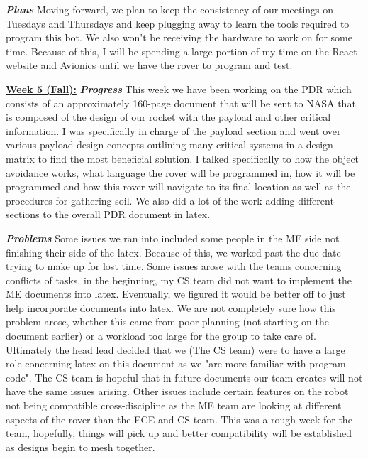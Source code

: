 \documentclass[onecolumn, draftclsnofoot, 10pt, compsoc]{IEEEtran}
\begin{document}
\textbf{\textit{{Plans}}}
\newline 
Moving forward, we plan to keep the consistency of our meetings on Tuesdays and Thursdays and keep plugging away to learn the tools required to program this bot. We also won't be receiving the hardware to work on for some time. Because of this, I will be spending a large portion of my time on the React website and Avionics until we have the rover to program and test. \\
\newline 

\underline{\textbf{Week 5 (Fall):}}
\newline\textbf{\textit{{Progress}}}
\newline 
This week we have been working on the PDR which consists of an approximately 160-page document that will be sent to NASA that is composed of the design of our rocket with the payload and other critical information. I was specifically in charge of the payload section and went over various payload design concepts outlining many critical systems in a design matrix to find the most beneficial solution. I talked specifically to how the object avoidance works, what language the rover will be programmed in, how it will be programmed and how this rover will navigate to its final location as well as the procedures for gathering soil.  We also did a lot of the work adding different sections to the overall PDR document in latex. 
\newline 

\textbf{\textit{{Problems}}}
\newline 
Some issues we ran into included some people in the ME side not finishing their side of the latex. Because of this, we worked past the due date trying to make up for lost time. Some issues arose with the teams concerning conflicts of tasks, in the beginning, my CS team did not want to implement the ME documents into latex. Eventually, we figured it would be better off to just help incorporate documents into latex. We are not completely sure how this problem arose, whether this came from poor planning (not starting on the document earlier) or a workload too large for the group to take care of. Ultimately the head lead decided that we (The CS team) were to have a large role concerning latex on this document as we "are more familiar with program code". The CS team is hopeful that in future documents our team creates will not have the same issues arising. Other issues include certain features on the robot not being compatible cross-discipline as the ME team are looking at different aspects of the rover than the ECE and CS team. This was a rough week for the team, hopefully, things will pick up and better compatibility will be established as designs begin to mesh together. 
\newline 
\end{document}
